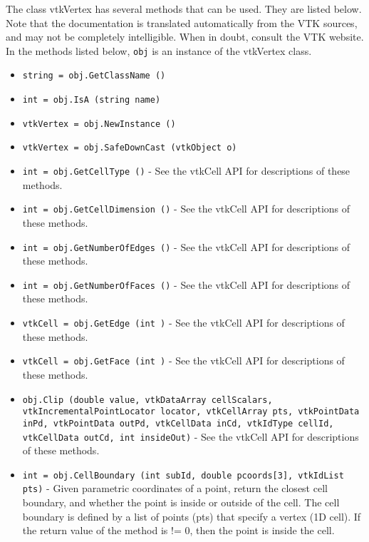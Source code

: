The class vtkVertex has several methods that can be used.
  They are listed below.
Note that the documentation is translated automatically from the VTK sources,
and may not be completely intelligible.  When in doubt, consult the VTK website.
In the methods listed below, \verb|obj| is an instance of the vtkVertex class.
\begin{itemize}
\item  \verb|string = obj.GetClassName ()|

\item  \verb|int = obj.IsA (string name)|

\item  \verb|vtkVertex = obj.NewInstance ()|

\item  \verb|vtkVertex = obj.SafeDownCast (vtkObject o)|

\item  \verb|int = obj.GetCellType ()| -  See the vtkCell API for descriptions of these methods.

\item  \verb|int = obj.GetCellDimension ()| -  See the vtkCell API for descriptions of these methods.

\item  \verb|int = obj.GetNumberOfEdges ()| -  See the vtkCell API for descriptions of these methods.

\item  \verb|int = obj.GetNumberOfFaces ()| -  See the vtkCell API for descriptions of these methods.

\item  \verb|vtkCell = obj.GetEdge (int )| -  See the vtkCell API for descriptions of these methods.

\item  \verb|vtkCell = obj.GetFace (int )| -  See the vtkCell API for descriptions of these methods.

\item  \verb|obj.Clip (double value, vtkDataArray cellScalars, vtkIncrementalPointLocator locator, vtkCellArray pts, vtkPointData inPd, vtkPointData outPd, vtkCellData inCd, vtkIdType cellId, vtkCellData outCd, int insideOut)| -  See the vtkCell API for descriptions of these methods.

\item  \verb|int = obj.CellBoundary (int subId, double pcoords[3], vtkIdList pts)| -  Given parametric coordinates of a point, return the closest cell
 boundary, and whether the point is inside or outside of the cell. The
 cell boundary is defined by a list of points (pts) that specify a vertex
 (1D cell).  If the return value of the method is != 0, then the point is
 inside the cell.


\end{itemize}
